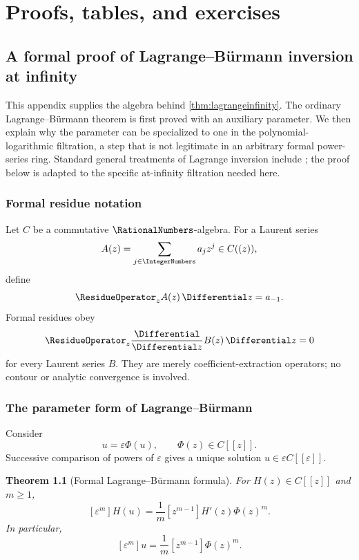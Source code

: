 \documentclass[11pt,oneside,openany]{book}
\newtheorem{theorem}{Theorem}[chapter]
\newcommand{\eps}{\varepsilon}
\begin{document}
\appendix

\part{Proofs, tables, and exercises}

\chapter{A formal proof of Lagrange--Bürmann inversion at infinity}
\label{app:lagrangeproof}

This appendix supplies the algebra behind
\cref{thm:lagrangeinfinity}.  The ordinary Lagrange--Bürmann theorem is first
proved with an auxiliary parameter.  We then explain why the parameter can be
specialized to one in the polynomial-logarithmic filtration, a step that is not
legitimate in an arbitrary formal power-series ring.
Standard general treatments of Lagrange inversion include
\cite{Comtet1974,FlajoletSedgewick2009}; the proof below is adapted to the
specific at-infinity filtration needed here.

\section{Formal residue notation}
Let \(C\) be a commutative \(\RationalNumbers\)-algebra.  For a Laurent series
\[
 A(z)=\sum_{j\in\IntegerNumbers}a_jz^j\in C((z)),
\]
define
\[
 \ResidueOperator_z A(z)\,\Differential z=a_{-1}.
\]
Formal residues obey
\begin{equation}\label{eq:formalresderivative}
 \ResidueOperator_z \frac{\Differential}{\Differential z}B(z)\,\Differential z=0
\end{equation}
for every Laurent series \(B\).  They are merely coefficient-extraction
operators; no contour or analytic convergence is involved.

\section{The parameter form of Lagrange--Bürmann}
Consider
\begin{equation}\label{eq:lagrangeabstract}
 u=\eps\Phi(u),
 \qquad \Phi(z)\in C[[z]].
\end{equation}
Successive comparison of powers of \(\eps\) gives a unique solution
\(u\in\eps C[[\eps]]\).

\begin{theorem}[Formal Lagrange--Bürmann formula]
\label{thm:formalLBappendix}
For \(H(z)\in C[[z]]\) and \(m\geq1\),
\begin{equation}\label{eq:formalLBH}
 [\eps^m]H(u)
 =\frac1m[z^{m-1}]H'(z)\Phi(z)^m.
\end{equation}
In particular,
\begin{equation}\label{eq:formalLBu}
 [\eps^m]u
 =\frac1m[z^{m-1}]\Phi(z)^m.
\end{equation}
\end{theorem}
\end{document}
